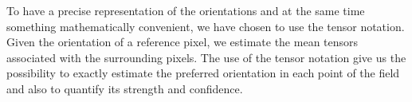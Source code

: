\documentclass{llncs}
\makeatletter
\DeclareRobustCommand\onedot{\futurelet\@let@token\@onedot}
\def\@onedot{\ifx\@let@token.\else.\null\fi\xspace}
\def\etal{\emph{et al}\onedot}
\makeatother
\begin{document}






To have a precise representation of the orientations and at the same time
something mathematically convenient, we have chosen to use the tensor notation.
Given the orientation of a reference pixel, we estimate the mean
tensors associated with the surrounding pixels. The use of the tensor notation
give us the possibility to exactly estimate the preferred orientation in each
point of the field and also to quantify its strength and confidence.

\end{document}
